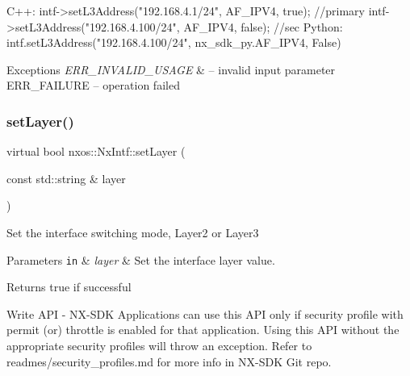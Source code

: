 \begin{DoxyCode}
C++:
    intf->setL3Address(\textcolor{stringliteral}{"192.168.4.1/24"}, AF\_IPV4, \textcolor{keyword}{true}); \textcolor{comment}{//primary}
    intf->setL3Address(\textcolor{stringliteral}{"192.168.4.100/24"}, AF\_IPV4, \textcolor{keyword}{false}); \textcolor{comment}{//sec}
Python:
    intf.setL3Address(\textcolor{stringliteral}{"192.168.4.100/24"}, nx\_sdk\_py.AF\_IPV4, False)
\end{DoxyCode}



\begin{DoxyExceptions}{Exceptions}
{\em E\+R\+R\+\_\+\+I\+N\+V\+A\+L\+I\+D\+\_\+\+U\+S\+A\+GE} & -- invalid input parameter E\+R\+R\+\_\+\+F\+A\+I\+L\+U\+RE -- operation failed \\
\hline
\end{DoxyExceptions}
\mbox{\label{classnxos_1_1_nx_intf_a20e5e820227e592874bf155573e3e700}} 
\subsubsection{\texorpdfstring{set\+Layer()}{setLayer()}}
{\footnotesize\ttfamily virtual bool nxos\+::\+Nx\+Intf\+::set\+Layer (\begin{DoxyParamCaption}\item[{const std\+::string \&}]{layer }\end{DoxyParamCaption})\hspace{0.3cm}{\ttfamily [pure virtual]}}

Set the interface switching mode, Layer2 or Layer3 
\begin{DoxyParams}[1]{Parameters}
\mbox{\tt in}  & {\em layer} & Set the interface layer value. \\
\hline
\end{DoxyParams}
\begin{DoxyReturn}{Returns}
true if successful
\end{DoxyReturn}
\begin{DoxyVerb}Write API - NX-SDK Applications can use this API only if security profile with permit (or) throttle is
            enabled for that application. Using this API without the appropriate security profiles will
            throw an exception. Refer to readmes/security_profiles.md for more info in NX-SDK Git repo.
\end{DoxyVerb}



